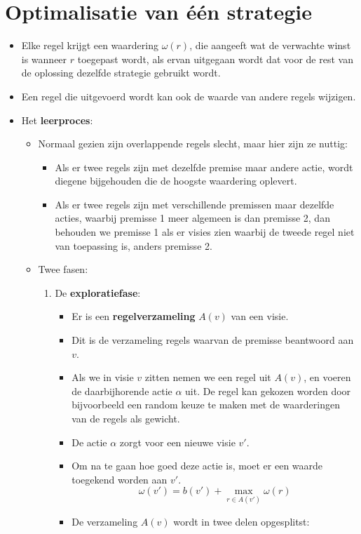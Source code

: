 \section{Optimalisatie van één strategie}
\begin{itemize}
	\item Elke regel krijgt een waardering $\omega(r)$, die aangeeft wat de verwachte winst is wanneer $r$ toegepast wordt, als ervan uitgegaan wordt dat voor de rest van de oplossing dezelfde strategie gebruikt wordt.
	\item Een regel die uitgevoerd wordt kan ook de waarde van andere regels wijzigen.
	\item Het \textbf{leerproces}:
	\begin{itemize}
		\item Normaal gezien zijn overlappende regels slecht, maar hier zijn ze nuttig:
		\begin{itemize}
			\item Als er twee regels zijn met dezelfde premise maar andere actie, wordt diegene bijgehouden die de hoogste waardering oplevert.
			\item Als er twee regels zijn met verschillende premissen maar dezelfde acties, waarbij premisse 1 meer algemeen is dan premisse 2, dan behouden we premisse 1 als er visies zien waarbij de tweede regel niet van toepassing is, anders premisse 2.
		\end{itemize}
		\item Twee fasen:
		\begin{enumerate}
			\item De \textbf{exploratiefase}:
			\begin{itemize}
				\item Er is een \textbf{regelverzameling} $A(v)$ van een visie. 
				\item Dit is de verzameling regels waarvan de premisse beantwoord aan $v$.
				\item Als we in visie $v$ zitten nemen we een regel uit $A(v)$, en voeren de daarbijhorende actie $\alpha$ uit. De regel kan gekozen worden door bijvoorbeeld een random keuze te maken met de waarderingen van de regels als gewicht.
				\item De actie $\alpha$ zorgt voor een nieuwe visie $v'$.
				\item Om na te gaan hoe goed deze actie is, moet er een waarde toegekend worden aan $v'$.
				$$\omega(v') = b(v') + \max_{r \in A(v')} \omega(r)$$
				\item De verzameling $A(v)$ wordt in twee delen opgesplitst:

\end{itemize}
\end{enumerate}
\end{itemize}
\end{itemize}

